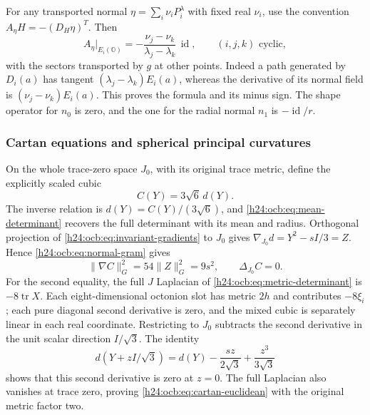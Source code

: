 For any transported normal $\eta=\sum_i\nu_iP_i^\lambda$ with fixed
real $\nu_i$, use the convention $A_\eta H=-(D_H\eta)^T$. Then
\begin{equation}
 A_\eta\big|_{E_i(\mathbb O)}
 =-\frac{\nu_j-\nu_k}{\lambda_j-\lambda_k}\,\operatorname{id},
 \qquad(i,j,k)\text{ cyclic},
 \label{h24:ocb:eq:shape-operator}\tag{OCB27}
\end{equation}
with the sectors transported by $g$ at other points. Indeed a path
generated by $D_i(a)$ has tangent
$(\lambda_j-\lambda_k)E_i(a)$, whereas the derivative of its
normal field is $(\nu_j-\nu_k)E_i(a)$. This proves the formula
and its minus sign. The shape operator for $n_0$ is zero, and the
one for the radial normal $n_1$ is $-\operatorname{id}/r$.

\subsubsection{Cartan equations and spherical principal curvatures}
\label{h24:ocb:sec:cartan-equations}

On the whole trace-zero space $J_0$, with its original trace metric,
define the explicitly scaled cubic
\begin{equation}
 C(Y)=3\sqrt6\,d(Y).
 \label{h24:ocb:eq:cartan-polynomial}\tag{OCB28}
\end{equation}
The inverse relation is $d(Y)=C(Y)/(3\sqrt6)$, and
\eqref{h24:ocb:eq:mean-determinant} recovers the full determinant with
its mean and radius. Orthogonal projection of
\eqref{h24:ocb:eq:invariant-gradients} to $J_0$ gives
$\nabla_{J_0}d=Y^2-sI/3=Z$. Hence
\eqref{h24:ocb:eq:normal-gram} gives
\begin{equation}
 \|\nabla C\|_G^2=54\|Z\|_G^2=9s^2,
 \qquad\Delta_{J_0}C=0.
 \label{h24:ocb:eq:cartan-euclidean}\tag{OCB29}
\end{equation}
For the second equality, the full $J$ Laplacian of
\eqref{h24:ocb:eq:metric-determinant} is $-8\operatorname{tr}X$.
Each eight-dimensional octonion slot has metric $2h$ and contributes
$-8\xi_i$; each pure diagonal second derivative is zero, and the
mixed cubic is separately linear in each real coordinate. Restricting
to $J_0$ subtracts the second derivative in the unit scalar direction
$I/\sqrt3$. The identity
\[
 d(Y+zI/\sqrt3)=d(Y)-\frac{s z}{2\sqrt3}
                              +\frac{z^3}{3\sqrt3}
\]
shows that this second derivative is zero at $z=0$. The full
Laplacian also vanishes at trace zero, proving
\eqref{h24:ocb:eq:cartan-euclidean} with the original metric factor two.

